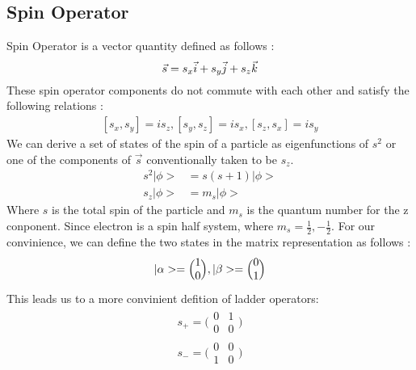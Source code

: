 \documentclass[11pt]{article}   	%
\begin{document}
\subsection{Spin Operator}
	Spin Operator is a vector quantity defined as follows :
	\begin{equation}
		\vec{s}=s_x \vec{i}+s_y\vec{j} + s_z\vec{k}\\
	\end{equation}
	These spin operator components do not commute with each other and satisfy the following relations :
	\begin{equation}
	\begin{split}
		[s_x,s_y]=is_z,   
		[s_y,s_z]=is_x,   
		[s_z,s_x]=is_y
	\end{split}
	\end{equation}
	We can derive a set of states of the spin of a particle as eigenfunctions of $s^2$ or one of the components of $\vec{s}$ conventionally taken to be $s_z$. \\
	\begin{equation}
	\begin{split}	
		s^2|\phi>&=s(s+1)|\phi>\\
		s_z|\phi>&=m_s|\phi>
	\end{split}
	\end{equation}
	Where $s$ is the total spin of the particle and $m_s$ is the quantum number for the z conponent. 
	Since electron is a spin half system, where $m_s=\frac{1}{2} , -\frac{1}{2}$. 
	For our convinience, we can define the two states in the matrix representation as follows :\\
	\begin{equation}
		|\alpha>=\Big(\begin{matrix} 1\\ 0\end{matrix}\Big), 
		|\beta>=\Big(\begin{matrix} 0\\ 1\end{matrix}\Big)\\
	\end{equation}
	This leads us to a more convinient defition of ladder operators:
	\begin{equation}
	\begin{split}
	s_+=\bigg(\begin{matrix} 0 & 1\\ 0 & 0\end{matrix}\bigg)\\
	s_-=\bigg(\begin{matrix} 0 & 0\\ 1 & 0\end{matrix}\bigg)\\
	\end{split}
	\end{equation}
\end{document}
